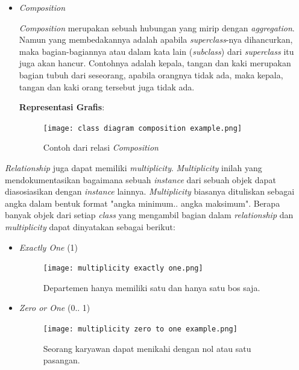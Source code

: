 \documentclass[a4paper]{article}
\begin{document}
\begin{enumerate}
\begin{itemize}
        \item \textit{Composition}

        \textit{Composition} merupakan sebuah hubungan yang mirip dengan \textit{aggregation}. Namun yang membedakannya adalah apabila \textit{superclass}-nya dihancurkan, maka bagian-bagiannya atau dalam kata lain (\textit{subclass}) dari \textit{superclass} itu juga akan hancur. Contohnya adalah kepala, tangan dan kaki merupakan bagian tubuh dari seseorang, apabila orangnya tidak ada, maka kepala, tangan dan kaki orang tersebut juga tidak ada\autocite{what-is-class-diagram}.

        \textbf{Representasi Grafis}:\\
        \begin{figure}[h]
            \centering
            \texttt{[image: class diagram composition example.png]}
            \caption{Contoh dari relasi \textit{Composition}}
        \end{figure}
    \end{itemize}
    \textit{Relationship} juga dapat memiliki \textit{multiplicity}. \textit{Multiplicity} inilah yang mendokumentasikan bagaimana sebuah \textit{instance} dari sebuah objek dapat diasosiasikan dengan \textit{instance} lainnya. \textit{Multiplicity} biasanya dituliskan sebagai angka dalam bentuk format "angka minimum.. angka maksimum"\autocite{systemanalysisdesign-class-diagram}. Berapa banyak objek dari setiap \textit{class} yang mengambil bagian dalam \textit{relationship} dan \textit{multiplicity} dapat dinyatakan sebagai berikut:
    \begin{itemize}
        \item \textit{Exactly One} (1)\\
        \begin{figure}[h]
            \centering
            \texttt{[image: multiplicity exactly one.png]}\\
            \caption{Departemen hanya memiliki satu dan hanya satu bos saja.}
        \end{figure}
        \newpage
        \item \textit{Zero or One} (0.. 1)\\
        \begin{figure}[h]
            \centering
            \texttt{[image: multiplicity zero to one example.png]}\\
            \caption{Seorang karyawan dapat menikahi dengan nol atau satu pasangan.}

\end{figure}
\end{itemize}
\end{enumerate}
\end{document}
